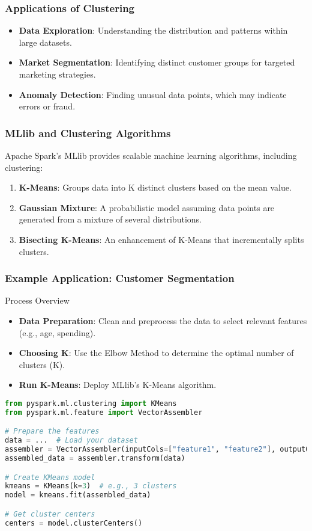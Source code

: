 \documentclass[aspectratio=169]{beamer}
\begin{document}
\begin{frame}[fragile]
    \frametitle{Applications of Clustering}
    \begin{itemize}
        \item \textbf{Data Exploration}: Understanding the distribution and patterns within large datasets.
        \item \textbf{Market Segmentation}: Identifying distinct customer groups for targeted marketing strategies.
        \item \textbf{Anomaly Detection}: Finding unusual data points, which may indicate errors or fraud.
    \end{itemize}
\end{frame}

\begin{frame}[fragile]
    \frametitle{MLlib and Clustering Algorithms}
    Apache Spark's MLlib provides scalable machine learning algorithms, including clustering:
    \begin{enumerate}
        \item \textbf{K-Means}: Groups data into K distinct clusters based on the mean value.
        \item \textbf{Gaussian Mixture}: A probabilistic model assuming data points are generated from a mixture of several distributions.
        \item \textbf{Bisecting K-Means}: An enhancement of K-Means that incrementally splits clusters.
    \end{enumerate}
\end{frame}

\begin{frame}[fragile]
    \frametitle{Example Application: Customer Segmentation}
    \begin{block}{Process Overview}
        \begin{itemize}
            \item \textbf{Data Preparation}: Clean and preprocess the data to select relevant features (e.g., age, spending).
            \item \textbf{Choosing K}: Use the Elbow Method to determine the optimal number of clusters (K).
            \item \textbf{Run K-Means}: Deploy MLlib’s K-Means algorithm.
        \end{itemize}
    \end{block}
    \begin{lstlisting}[language=Python]
from pyspark.ml.clustering import KMeans
from pyspark.ml.feature import VectorAssembler

# Prepare the features
data = ...  # Load your dataset
assembler = VectorAssembler(inputCols=["feature1", "feature2"], outputCol="features")
assembled_data = assembler.transform(data)

# Create KMeans model
kmeans = KMeans(k=3)  # e.g., 3 clusters
model = kmeans.fit(assembled_data)

# Get cluster centers
centers = model.clusterCenters()
    \end{lstlisting}
\end{frame}
\end{document}
